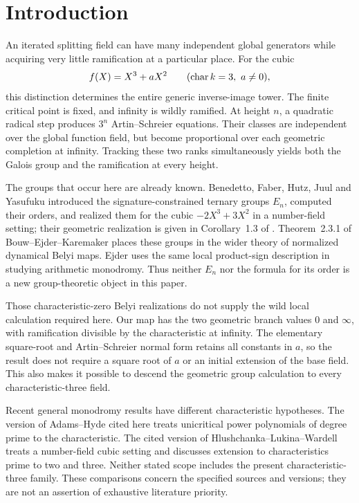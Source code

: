 \section{Introduction}\label{sec:introduction}

An iterated splitting field can have many independent global generators
while acquiring very little ramification at a particular place. For
the cubic
\[
  f(X)=X^3+aX^2\qquad (\operatorname{char} k=3,\ a\neq0),
\]
this distinction determines the entire generic inverse-image tower.
The finite critical point is fixed, and infinity is wildly ramified.
At height $n$, a quadratic radical step produces $3^n$
Artin--Schreier equations. Their classes are independent over the global
function field, but become proportional over each geometric completion
at infinity. Tracking these two ranks simultaneously yields both the
Galois group and the ramification at every height.

The groups that occur here are already known. Benedetto, Faber, Hutz,
Juul and Yasufuku introduced the signature-constrained ternary groups
$E_n$, computed their orders, and realized them for the cubic
$-2X^3+3X^2$ in a number-field setting; their geometric realization is
given in Corollary~1.3 of \cite{benedetto2017cubic}.
Theorem~2.3.1 of Bouw--Ejder--Karemaker \cite{bouw2021belyi}
places these groups in the wider theory of normalized dynamical Belyi
maps. Ejder \cite{ejder2022arithmetic} uses the same local product-sign
description in studying arithmetic monodromy. Thus neither $E_n$ nor
the formula for its order is a new group-theoretic object in this paper.

Those characteristic-zero Belyi realizations do not supply the wild
local calculation required here. Our map has the two geometric branch
values $0$ and $\infty$, with ramification divisible by the
characteristic at infinity. The elementary square-root and
Artin--Schreier normal form retains all constants in $a$, so the result
does not require a square root of $a$ or an initial extension of the
base field. This also makes it possible to descend the geometric group
calculation to every characteristic-three field.

Recent general monodromy results have different characteristic
hypotheses. The version of Adams--Hyde \cite{adams2025unicritical}
cited here treats unicritical power polynomials of degree prime to the
characteristic. The cited version of Hlushchanka--Lukina--Wardell
\cite{hlushchanka2025cubic} treats a number-field cubic setting and
discusses extension to characteristics prime to two and three.
Neither stated scope includes the present characteristic-three family.
These comparisons concern the specified sources and versions; they
are not an assertion of exhaustive literature priority.

